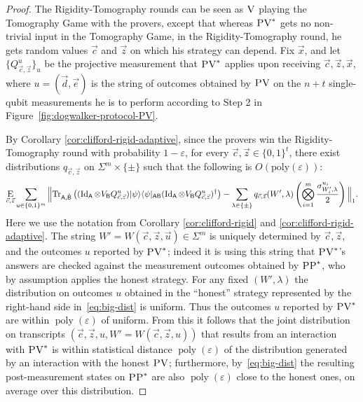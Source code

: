 \documentclass[11pt]{article}
\theoremstyle{remark}
\theoremstyle{definition}
\newcommand{\ket}[1]{|#1\rangle}
\newcommand{\bra}[1]{\langle#1|}
\newcommand{\Tr}{\mbox{\rm Tr}}
\newcommand{\Id}{\ensuremath{\mathop{\rm Id}\nolimits}}
\newcommand{\Es}[1]{\ensuremath{\mathop{\textsc{E}}}_{#1}}
\DeclareMathOperator{\poly}{poly}
\newcommand{\reg}[1]{{\textsf{#1}}}
\newcommand{\eps}{\varepsilon}
\newcommand{\ver}{\textsc{V}}
\newcommand{\pv}{\textsc{PV}}
\newcommand{\pp}{\textsc{PP}}
\begin{document}
\begin{proof}
The Rigidity-Tomography rounds can be seen as $\ver$ playing the Tomography Game
  with the provers, except that whereas $\pv^*$ gets no non-trivial input in the
  Tomography Game, in the Rigidity-Tomography round, he gets random values
  $\vec{c}$ and $\vec{z}$ on which his strategy can depend. Fix $\vec{x}$, and let
  $\{Q_{\vec{c},\vec{z}}^{u}\}_{u}$ be the projective measurement that $\pv^*$
  applies upon receiving $\vec{c},\vec{z},\vec{x}$, where  $u = (\vec{d},\vec{e})$ is
  the string of outcomes obtained by $\pv$ on the $n+t$ single-qubit
  measurements he is to perform according to Step 2 in
  Figure~\ref{fig:dogwalker-protocol-PV}. 

By Corollary \ref{cor:clifford-rigid-adaptive}, since the provers win the Rigidity-Tomography round with probability $1-\eps$, for every $\vec{c},\vec{z}\in\{0,1\}^t$,
there exist distributions $q_{\vec{c},\vec{z}}$ on $\Sigma^m\times\{\pm\}$ such that the following is $O(\mathrm{poly}(\eps))$:
\begin{equation}\label{eq:big-dist}
\Es{\vec{c},\vec{z}}\sum_{ u\in \{0, 1\}^m}
\Big\| \Tr_{\reg{A},\hat{\reg{B}}}\left((\Id_{\reg{A}}\otimes V_{\reg{B}} Q_{\vec{c},\vec{z}}^{u})\ket{\psi}\bra{\psi}_{\reg{AB}}(\Id_{\reg{A}}\otimes V_{\reg{B}} Q_{\vec{c},\vec{z}}^{u})^\dagger\right)
- \sum_{\lambda\in\{\pm\}}q_{\vec{c},\vec{z}}(W',\lambda)\left(\bigotimes_{i=1}^m \frac{\sigma^{u_i}_{W_i',\lambda}}{2}\right)\Big\|_1. 
\end{equation}
Here we use the notation from Corollary \ref{cor:clifford-rigid} and
  \ref{cor:clifford-rigid-adaptive}. The string
  $W'=W(\vec{c},\vec{z},\vec{u})\in\Sigma^m$ is uniquely determined by
  $\vec{c},\vec{z}$, and the outcomes ${u}$ reported by $\pv^*$; indeed it
  is using this string that $\pv^*$'s answers are checked against the
  measurement outcomes obtained by $\pp^*$, who by assumption applies the
  honest strategy. For any fixed $(W',\lambda)$ the distribution on
  outcomes $u$ obtained in the ``honest'' strategy represented by the right-hand
  side in~\eqref{eq:big-dist} is uniform. Thus the outcomes $u$ reported by
  $\pv^*$ are within $\poly(\eps)$ of uniform. From this it follows that the joint distribution on transcripts $(\vec{c},\vec{z},u,W'=W(\vec{c},\vec{z},u))$ that results from an interaction with $\pv^*$ is within statistical distance $\poly(\eps)$ of the distribution generated by an interaction with the honest $\pv$; furthermore, by~\eqref{eq:big-dist} the resulting post-measurement states on $\pp^*$ are also $\poly(\eps)$ close to the honest ones, on average over this distribution. 


\end{proof}
\end{document}
